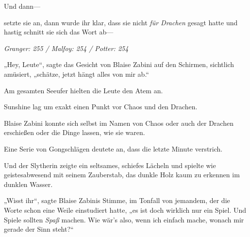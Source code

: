 Und dann—

 setzte sie an, dann wurde ihr klar, dass sie nicht \emph{für Drachen} gesagt hatte und hastig schnitt sie sich das Wort ab—

\later

\emph{Granger: 255 / Malfoy: 254 / Potter: 254}

„Hey, Leute“, sagte das Gesicht von Blaise Zabini auf den Schirmen, sichtlich amüsiert, „schätze, jetzt hängt alles von mir ab.“

Am gesamten Seeufer hielten die Leute den Atem an.

Sunshine lag um exakt einen Punkt vor Chaos und den Drachen.

Blaise Zabini konnte sich selbst im Namen von Chaos oder auch der Drachen erschießen oder die Dinge lassen, wie sie waren.

Eine Serie von Gongschlägen deutete an, dass die letzte Minute verstrich.

Und der Slytherin zeigte ein seltsames, schiefes Lächeln und spielte wie geistesabwesend mit seinem Zauberstab, das dunkle Holz kaum zu erkennen im dunklen Wasser.

„Wisst ihr“, sagte Blaise Zabinis Stimme, im Tonfall von jemandem, der die Worte schon eine Weile einstudiert hatte, „es ist doch wirklich nur ein Spiel. Und Spiele sollten \emph{Spaß} machen. Wie wär’s also, wenn ich einfach mache, wonach mir gerade der Sinn steht?“

